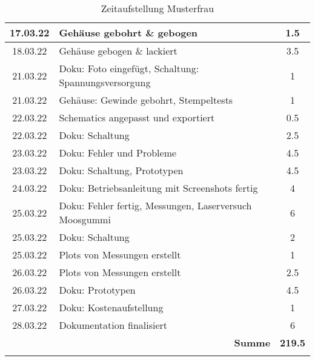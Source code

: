 \begin{longtable}{c|p{10cm}|c}
    17.03.22       & Gehäuse gebohrt \& gebogen                                                                             & 1.5                   \\ \hline
    18.03.22       & Gehäuse gebogen \& lackiert                                                                            & 3.5                   \\ \hline
    21.03.22       & Doku: Foto eingefügt, Schaltung: Spannungsversorgung                                                   & 1                     \\ \hline
    21.03.22       & Gehäuse: Gewinde gebohrt, Stempeltests                                                                 & 1                     \\ \hline
    22.03.22       & Schematics angepasst und exportiert                                                                    & 0.5                   \\ \hline
    22.03.22       & Doku: Schaltung                                                                                        & 2.5                   \\ \hline
    23.03.22       & Doku: Fehler und Probleme                                                                              & 4.5                   \\ \hline
    23.03.22       & Doku: Schaltung, Prototypen                                                                            & 4.5                   \\ \hline
    24.03.22       & Doku: Betriebsanleitung mit Screenshots fertig                                                         & 4                     \\ \hline
    25.03.22       & Doku: Fehler fertig, Messungen, \newline Laserversuch Moosgummi                                                 & 6                     \\ \hline
    25.03.22       & Doku: Schaltung & 2 \\ \hline
    25.03.22       & Plots von Messungen erstellt & 1 \\ \hline
    26.03.22       & Plots von Messungen erstellt & 2.5 \\ \hline
    26.03.22       & Doku: Prototypen & 4.5 \\ \hline
    27.03.22       & Doku: Kostenaufstellung & 1 \\ \hline
    28.03.22       & Dokumentation finalisiert & 6 \\ \hline
        & \multicolumn{1}{r|}{\textbf{Summe}} &   \textbf{219.5} \\
    \caption{Zeitaufstellung Musterfrau}
    \label{tab:zeit_tobi}
\end{longtable}